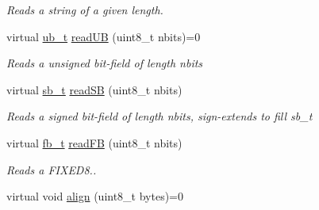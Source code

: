 \begin{DoxyCompactItemize}
\begin{DoxyCompactList}\small\item\em Reads a string of a given length. \end{DoxyCompactList}\item 
\hypertarget{classjswf_1_1io_1_1_generic_reader_aa1445404182efbda9c46b6c9b9ea9c74}{virtual \hyperlink{namespacejswf_a38f034ab4371db2c8aee66e1c92b5bc7}{ub\+\_\+t} \hyperlink{classjswf_1_1io_1_1_generic_reader_aa1445404182efbda9c46b6c9b9ea9c74}{read\+U\+B} (uint8\+\_\+t nbits)=0}\label{classjswf_1_1io_1_1_generic_reader_aa1445404182efbda9c46b6c9b9ea9c74}

\begin{DoxyCompactList}\small\item\em Reads a unsigned bit-\/field of length {\ttfamily nbits} \end{DoxyCompactList}\item 
\hypertarget{classjswf_1_1io_1_1_generic_reader_ab969b53faac7ff67b4fe8144d6d27c78}{virtual \hyperlink{namespacejswf_aa56b2b764590a9e19a5e66693364aceb}{sb\+\_\+t} \hyperlink{classjswf_1_1io_1_1_generic_reader_ab969b53faac7ff67b4fe8144d6d27c78}{read\+S\+B} (uint8\+\_\+t nbits)}\label{classjswf_1_1io_1_1_generic_reader_ab969b53faac7ff67b4fe8144d6d27c78}

\begin{DoxyCompactList}\small\item\em Reads a signed bit-\/field of length {\ttfamily nbits}, sign-\/extends to fill {\ttfamily sb\+\_\+t} \end{DoxyCompactList}\item 
\hypertarget{classjswf_1_1io_1_1_generic_reader_a82a78364fdd97b6eff791e0a768e1d46}{virtual \hyperlink{namespacejswf_a419cb8aa8b625074e6753d189783b2f4}{fb\+\_\+t} \hyperlink{classjswf_1_1io_1_1_generic_reader_a82a78364fdd97b6eff791e0a768e1d46}{read\+F\+B} (uint8\+\_\+t nbits)}\label{classjswf_1_1io_1_1_generic_reader_a82a78364fdd97b6eff791e0a768e1d46}

\begin{DoxyCompactList}\small\item\em Reads a F\+I\+X\+E\+D8.. \end{DoxyCompactList}\item 
\hypertarget{classjswf_1_1io_1_1_generic_reader_ab9e82ef9f3e31b2e9a4c7578fc005483}{virtual void \hyperlink{classjswf_1_1io_1_1_generic_reader_ab9e82ef9f3e31b2e9a4c7578fc005483}{align} (uint8\+\_\+t bytes)=0}\label{classjswf_1_1io_1_1_generic_reader_ab9e82ef9f3e31b2e9a4c7578fc005483}


\end{DoxyCompactItemize}
